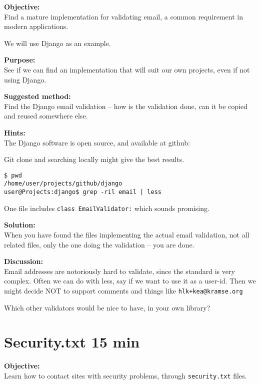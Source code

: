 \documentclass[a4paper,11pt,notitlepage]{report}
\begin{document}
{\bf Objective:}\\
Find a mature implementation for validating email, a common requirement in modern applications.

We will use Django as an example.

{\bf Purpose:}\\
See if we can find an implementation that will suit our own projects, even if not using Django.

{\bf Suggested method:}\\
Find the Django email validation -- how is the validation done, can it be copied and reused somewhere else.

{\bf Hints:}\\
The Django software is open source, and available at github:\\

Git clone and searching locally might give the best results.

\begin{verbatim}
$ pwd
/home/user/projects/github/django
user@Projects:django$ grep -ril email | less
\end{verbatim}

One file includes \verb+class EmailValidator:+ which sounds promising.


{\bf Solution:}\\
When you have found the files implementing the actual email validation, not all related files, only the one doing the validation -- you are done.

{\bf Discussion:}\\
Email addresses are notoriously hard to validate, since the standard is very complex. Often we can do with less, say if we want to use it as a user-id. Then we might decide NOT to support comments and things like \verb?hlk+kea@kramse.org?

Which other validators would be nice to have, in your own library?




\chapter{Security.txt 15 min}
\label{ex:security.txt}

{\bf Objective:}\\
Learn how to contact sites with security problems, through \verb+security.txt+ files.
\end{document}
